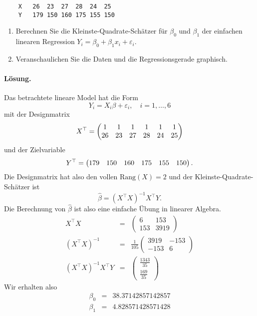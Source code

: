 \begin{lstlisting}
    X   26  23  27  28  24  25
    Y   179 150 160 175 155 150
\end{lstlisting}
\begin{enumerate}
    \item Berechnen Sie die Kleinste-Quadrate-Schätzer für $\beta_0$ und $\beta_1$
        der einfachen linearen Regression $Y_i = \beta_0 + \beta_1 x_i + \varepsilon_i$.
    \item Veranschaulichen Sie die Daten und die Regressionsgerade graphisch.
\end{enumerate}

\paragraph*{Lösung.  } Das betrachtete lineare Model hat die Form
\begin{equation}
    Y_i = X_i \beta + \varepsilon_i, \quad i=1,\ldots, 6
\end{equation}
mit der Designmatrix
$$ X^\top = \left(\begin{matrix} 1&1&1&1&1&1\cr 26&23&27&28&24&25\cr \end{matrix} \right) $$
und der Zielvariable
\begin{equation}
    Y^\top = \left( \begin{matrix} 179&150&160&175&155&150\cr   \end{matrix}  \right).
\end{equation}
Die Designmatrix hat also den vollen $\textrm{Rang}(X)=2$ und der Kleinste-Quadrate-Schätzer
ist 
\begin{equation}
    \hat \beta = \left( X^\top X \right)^{-1} X^\top Y.
\end{equation}
Die Berechnung von $\hat \beta$ ist also eine einfache Übung in linearer Algebra. 
\begin{eqnarray}
    X^\top X &=&  
    \left( {
    \begin{array}{cc}
        6 & 153 \\ 153 & 3919
    \end{array} }
    \right) \\
    \left(  X^\top X\right)^{-1} &=& \frac{1}{105} 
    \left( {
    \begin{array}{cc} 
        3919&-153 \\ -153&6
    \end{array} }
    \right) \\
    \left(  X^\top X\right)^{-1} X^\top Y &=& \left(
    \begin{array}{c}
        \frac{1343}{35} \\ \frac{169}{35}
    \end{array}
    \right)
\end{eqnarray}
Wir erhalten also 
\begin{eqnarray}
    \beta_0 &=&  38.37142857142857 \\
    \beta_1 &=&  4.828571428571428
\end{eqnarray}

